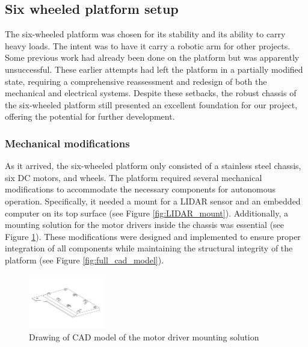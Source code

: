 \documentclass[11pt]{article}
\begin{document}
    \subsection{Six wheeled platform setup}

        The six-wheeled platform was chosen for its stability and its ability to carry heavy loads. The intent was to have it carry a robotic arm for other projects. Some previous work had already been done on the platform but was apparently unsuccessful. These earlier attempts had left the platform in a partially modified state, requiring a comprehensive reassessment and redesign of both the mechanical and electrical systems. Despite these setbacks, the robust chassis of the six-wheeled platform still presented an excellent foundation for our project, offering the potential for further development.

        \subsubsection{Mechanical modifications}
        As it arrived, the six-wheeled platform only consisted of a stainless steel chassis, six DC motors, and wheels. The platform required several mechanical modifications to accommodate the necessary components for autonomous operation. Specifically, it needed a mount for a LIDAR sensor and an embedded computer on its top surface (see Figure \ref{fig:LIDAR_mount}). Additionally, a mounting solution for the motor drivers inside the chassis was essential (see Figure \ref{fig:motor_driver_mount}). These modifications were designed and implemented to ensure proper integration of all components while maintaining the structural integrity of the platform (see Figure \ref{fig:full_cad_model}).
        
        \begin{figure}[H]
            \centering
            \includegraphics[width=0.3\textwidth]{Images/Motor_driver_holder.pdf}
            \caption{Drawing of CAD model of the motor driver mounting solution}
            \label{fig:motor_driver_mount}
        \end{figure}
        
\end{document}
